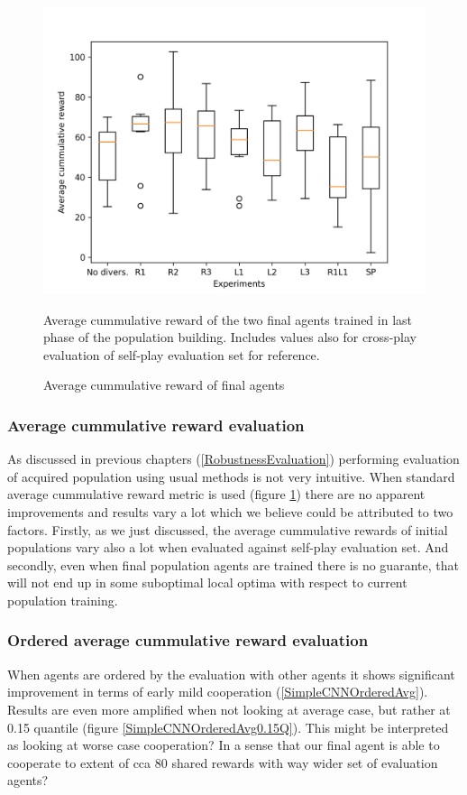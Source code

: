 \begin{figure}[!ht]
    \centering
    \includegraphics*[width=14cm]{../img/SimpleCnnExperimentsAvg.png}

    \caption{Average cummulative reward of final agents}
    \label{AvgCummulativeRewardEvaluated}
    \medskip
    \small 
    Average cummulative reward of the two final agents trained in last phase of the population building.
    Includes values also for cross-play evaluation of self-play evaluation set for reference. 

\end{figure}

\subsubsection{Average cummulative reward evaluation}

As discussed in previous chapters (\ref{RobustnessEvaluation}) performing evaluation of acquired population using usual methods is not very intuitive. 
When standard average cummulative reward metric is used (figure \ref{AvgCummulativeRewardEvaluated}) there are no apparent improvements and results vary a lot which we believe could be attributed to two factors.
Firstly, as we just discussed, the average cummulative rewards of initial populations vary also a lot when evaluated against self-play evaluation set.
And secondly, even when final population agents are trained there is no guarante, that will not end up in some suboptimal local optima with respect to current population training.


\subsubsection{Ordered average cummulative reward evaluation}
When agents are ordered by the evaluation with other agents it shows significant improvement in terms of early mild cooperation (\ref{SimpleCNNOrderedAvg}). 
Results are even more amplified when not looking at average case, but rather at 0.15 quantile (figure \ref{SimpleCNNOrderedAvg0.15Q}).
{\color{blue} This might be interpreted as looking at worse case cooperation? In a sense that our final agent is able to cooperate to extent of cca 80 shared rewards with way wider set of evaluation agents? }

